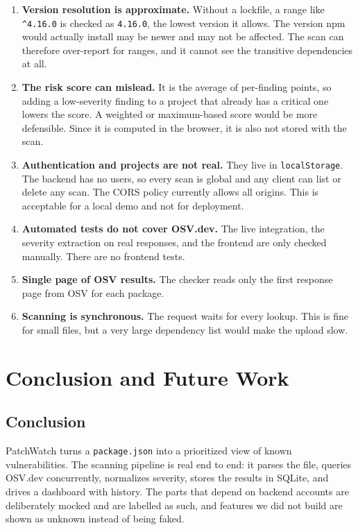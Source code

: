 \documentclass[12pt,a4paper]{report}
\begin{document}
\begin{enumerate}[leftmargin=*]
  \item \textbf{Version resolution is approximate.} Without a lockfile, a range like \verb|^4.16.0| is checked as \texttt{4.16.0}, the lowest version it allows. The version npm would actually install may be newer and may not be affected. The scan can therefore over-report for ranges, and it cannot see the transitive dependencies at all.
  \item \textbf{The risk score can mislead.} It is the average of per-finding points, so adding a low-severity finding to a project that already has a critical one lowers the score. A weighted or maximum-based score would be more defensible. Since it is computed in the browser, it is also not stored with the scan.
  \item \textbf{Authentication and projects are not real.} They live in \texttt{localStorage}. The backend has no users, so every scan is global and any client can list or delete any scan. The CORS policy currently allows all origins. This is acceptable for a local demo and not for deployment.
  \item \textbf{Automated tests do not cover OSV.dev.} The live integration, the severity extraction on real responses, and the frontend are only checked manually. There are no frontend tests.
  \item \textbf{Single page of OSV results.} The checker reads only the first response page from OSV for each package.
  \item \textbf{Scanning is synchronous.} The request waits for every lookup. This is fine for small files, but a very large dependency list would make the upload slow.
\end{enumerate}

\chapter{Conclusion and Future Work}

\section{Conclusion}
PatchWatch turns a \texttt{package.json} into a prioritized view of known vulnerabilities. The scanning pipeline is real end to end: it parses the file, queries OSV.dev concurrently, normalizes severity, stores the results in SQLite, and drives a dashboard with history. The parts that depend on backend accounts are deliberately mocked and are labelled as such, and features we did not build are shown as unknown instead of being faked.
\end{document}
